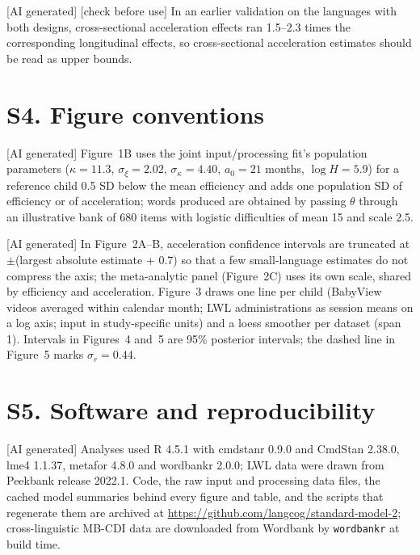 [AI generated] [check before use] In an earlier validation on the languages with
both designs, cross-sectional acceleration effects ran 1.5--2.3 times the
corresponding longitudinal effects, so cross-sectional acceleration estimates
should be read as upper bounds.

\section*{S4. Figure conventions}

[AI generated] Figure~1B uses the joint input/processing fit's population
parameters ($\kappa = 11.3$, $\sigma_\xi = 2.02$, $\sigma_\kappa = 4.40$, $a_0
= 21$ months, $\log H = 5.9$) for a reference child 0.5 SD below the mean
efficiency and adds one population SD of efficiency or of acceleration; words
produced are obtained by passing $\theta$ through an illustrative bank of 680
items with logistic difficulties of mean 15 and scale 2.5.

[AI generated] In Figure~2A--B, acceleration confidence intervals are truncated at
$\pm$(largest absolute estimate + 0.7) so that a few small-language estimates do
not compress the axis; the meta-analytic panel (Figure~2C) uses its own scale,
shared by efficiency and acceleration. Figure~3 draws one line per child (BabyView
videos averaged within calendar month; LWL administrations as session means on a
log axis; input in study-specific units) and a loess smoother per dataset (span 1).
Intervals in Figures~4 and~5 are 95\% posterior intervals; the dashed line in
Figure~5 marks $\sigma_r = 0.44$.

\section*{S5. Software and reproducibility}

[AI generated] Analyses used R 4.5.1 with cmdstanr 0.9.0 and CmdStan 2.38.0,
lme4 1.1.37, metafor 4.8.0 and wordbankr 2.0.0; LWL data were drawn from Peekbank
release 2022.1. Code, the raw input and processing data files, the cached model
summaries behind every figure and table, and the scripts that regenerate them are
archived at \url{https://github.com/langcog/standard-model-2}; cross-linguistic
MB-CDI data are downloaded from Wordbank by \texttt{wordbankr} at build time.
